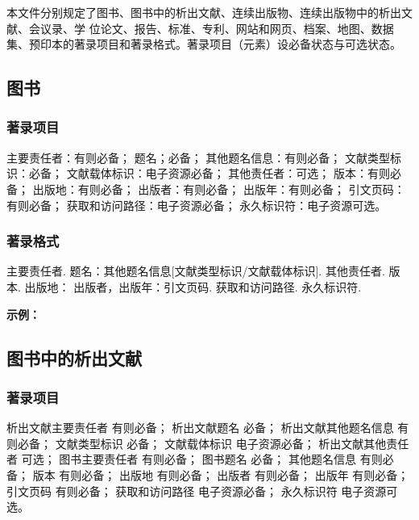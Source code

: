 \documentclass{article}
\begin{document}
本文件分别规定了图书、图书中的析出文献、连续出版物、连续出版物中的析出文献、会议录、学
位论文、报告、标准、专利、网站和网页、档案、地图、数据集、预印本的著录项目和著录格式。著录项目（元素）设必备状态与可选状态。

\subsection{图书}

\subsubsection{著录项目}

主要责任者：有则必备；
题名；必备；
其他题名信息：有则必备；
文献类型标识：必备；
文献载体标识：电子资源必备；
其他责任者：可选；
版本：有则必备；
出版地：有则必备；
出版者：有则必备；
出版年：有则必备；
引文页码：有则必备；
获取和访问路径：电子资源必备；
永久标识符：电子资源可选。

\subsubsection{著录格式}

主要责任者. 题名：其他题名信息[文献类型标识/文献载体标识]. 其他责任者. 版本. 出版地：
出版者，出版年：引文页码. 获取和访问路径. 永久标识符.

\begin{refsection}

\nocite{张伯伟2002--,
陈登原2000-29-29,
王夫之1865--,
顾炎武1992--,
1962-50-50,
战德臣2019,
哈里森沃尔德伦2012-235-236,
牛永敢2019,
美国妇产科医师学会2010-38-39,
中国企业投资协会2013--,
赵学功2001--,
中国造纸学会2003--,
PEEBLES2001--,
SADOCK2009,
InstituteForArt2023,
Kinchy2012-50-50,
Praetzellis2011-13-13}

\textbf{示例：}

{\printbibliography[heading=none,env=indentegenv]}
\end{refsection}


\subsection{图书中的析出文献}

\subsubsection{著录项目}

析出文献主要责任者 有则必备；
析出文献题名 必备；
析出文献其他题名信息 有则必备；
文献类型标识 必备；
文献载体标识 电子资源必备；
析出文献其他责任者 可选；
图书主要责任者 有则必备；
图书题名 必备；
其他题名信息 有则必备；
版本 有则必备；
出版地 有则必备；
出版者 有则必备；
出版年 有则必备；
引文页码 有则必备；
获取和访问路径 电子资源必备；
永久标识符 电子资源可选。
\end{document}
